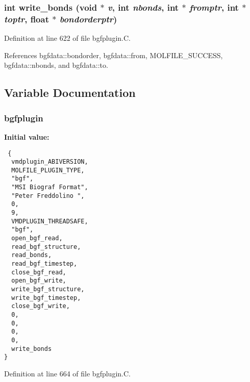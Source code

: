\subsubsection{\setlength{\rightskip}{0pt plus 5cm}int write\_\-bonds (void $\ast$ {\em v}, int {\em nbonds}, int $\ast$ {\em fromptr}, int $\ast$ {\em toptr}, float $\ast$ {\em bondorderptr})\hspace{0.3cm}{\tt  [static]}}\label{bgfplugin_8C_a15}




Definition at line 622 of file bgfplugin.C.

References bgfdata::bondorder, bgfdata::from, MOLFILE\_\-SUCCESS, bgfdata::nbonds, and bgfdata::to.

\subsection{Variable Documentation}
\subsubsection{ bgfplugin\hspace{0.3cm}{\tt  [static]}}\label{bgfplugin_8C_a1}


{\bf Initial value:}

\footnotesize\begin{verbatim} {
  vmdplugin_ABIVERSION,
  MOLFILE_PLUGIN_TYPE,                      
  "bgf",                                    
  "MSI Biograf Format",
  "Peter Freddolino ",    
  0,                                        
  9,                                        
  VMDPLUGIN_THREADSAFE,                     
  "bgf",
  open_bgf_read,
  read_bgf_structure,
  read_bonds,
  read_bgf_timestep,
  close_bgf_read,
  open_bgf_write,
  write_bgf_structure,
  write_bgf_timestep,
  close_bgf_write,
  0,                            
  0,                            
  0,
  0,
  write_bonds  
}\end{verbatim}\normalsize 


Definition at line 664 of file bgfplugin.C.